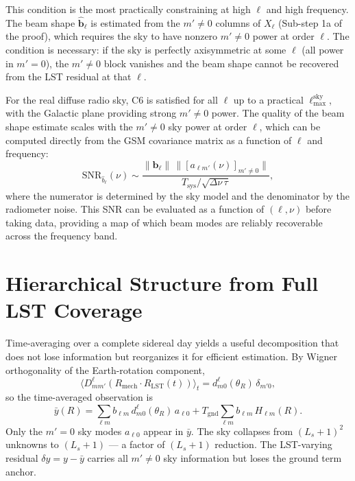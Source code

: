 \documentclass{aastex631}
\newcommand{\blm}{b_{\ell m}}
\newcommand{\Hlm}{H_{\ell m}}
\newcommand{\Tgnd}{T_\mathrm{gnd}}
\newcommand{\lmax}{\ell_\mathrm{max}}
\theoremstyle{plain}
\theoremstyle{remark}
\begin{document}
This condition is the most practically constraining at high $\ell$
and high frequency.
The beam shape $\hat{\mathbf{b}}_\ell$ is estimated from the
$m' \neq 0$ columns of $X_\ell$ (Sub-step 1a of the proof), which
requires the sky to have nonzero $m' \neq 0$ power at order $\ell$.
The condition is necessary: if the sky is perfectly axisymmetric at
some $\ell$ (all power in $m'=0$), the $m' \neq 0$ block vanishes
and the beam shape cannot be recovered from the LST residual at that
$\ell$.

For the real diffuse radio sky, C6 is satisfied for all $\ell$ up
to a practical $\lmax^\mathrm{sky}$, with the Galactic plane
providing strong $m' \neq 0$ power.
The quality of the beam shape estimate scales with the $m' \neq 0$
sky power at order $\ell$, which can be computed directly from the
GSM covariance matrix as a function of $\ell$ and frequency:
\begin{equation}
  \mathrm{SNR}_{\hat{b}_\ell}(\nu)
  \sim
  \frac{\|\mathbf{b}_\ell\|\,\|[a_{\ell m'}(\nu)]_{m'\neq 0}\|}
       {T_\mathrm{sys}/\sqrt{\Delta\nu\,\tau}},
\end{equation}
where the numerator is determined by the sky model and the
denominator by the radiometer noise.
This SNR can be evaluated as a function of $(\ell, \nu)$ before
taking data, providing a map of which beam modes are reliably
recoverable across the frequency band.

\section{Hierarchical Structure from Full LST Coverage}
\label{sec:hierarchy}

Time-averaging over a complete sidereal day yields a useful
decomposition that does not lose information but reorganizes it
for efficient estimation.
By Wigner orthogonality of the Earth-rotation component,
\begin{equation}
  \bigl\langle D^\ell_{mm'}(R_\mathrm{mech}\cdot R_\mathrm{LST}(t))
  \bigr\rangle_t = d^\ell_{m0}(\theta_R)\,\delta_{m'0},
\end{equation}
so the time-averaged observation is
\begin{equation} \label{eq:ybar}
  \bar{y}(R) = \sum_{\ell m} \blm\, d^\ell_{m0}(\theta_R)\, a_{\ell 0}
             + \Tgnd\sum_{\ell m}\blm\,\Hlm(R).
\end{equation}
Only the $m'=0$ sky modes $a_{\ell 0}$ appear in $\bar{y}$.
The sky collapses from $(L_s+1)^2$ unknowns to $(L_s+1)$ --- a
factor of $(L_s+1)$ reduction.
The LST-varying residual $\delta y = y - \bar{y}$ carries all
$m'\neq 0$ sky information but loses the ground term anchor.
\end{document}
